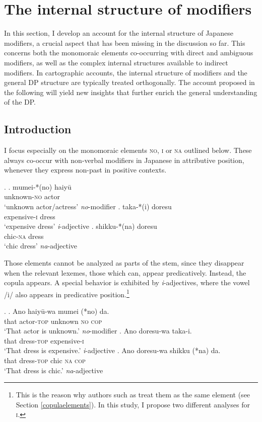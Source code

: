 \section{The internal structure of modifiers} \label{internalstructure}

In this section, I develop an account for the internal structure of Japanese modifiers, a crucial aspect that has been missing in the discussion so far. This concerns both the monomoraic elements co-occurring with direct and ambiguous modifiers, as well as the complex internal structures available to indirect modifiers. In cartographic accounts, the internal structure of modifiers and the general DP structure are typically treated orthogonally. The account proposed in the following will yield new insights that further enrich the general understanding of the DP.

\subsection{Introduction}
\largerpage
I focus especially on the monomoraic elements \textsc{no}, \textsc{i} or \textsc{na} outlined below. These always co-occur with non-verbal modifiers in Japanese in attributive position, whenever they express non-past in positive contexts.

\ex. \ag. mumei-*(no) haiyū\\
unknown-\textsc{no} actor\\
`unknown actor/actress’ \null \hfill \textit{no}-modifier \label{mumeino}
\bg. taka-*(i) doresu\\
expensive-\textsc{i} dress\\
`expensive dress' \null \hfill \textit{i}-adjective \label{takaimod1}
\cg. shikku-*(na) doresu\\
chic-\textsc{na} dress\\
`chic dress' \null \hfill \textit{na}-adjective \label{shikkunamod1}

Those elements cannot be analyzed as parts of the stem, since they disappear when the relevant lexemes, those which can, appear predicatively. Instead, the copula appears. A special behavior is exhibited by \textit{i}-adjectives, where the vowel /i/ also appears in predicative position.\footnote{This is the reason why authors such as \citet{nishiyama:1999:adj} treat them as the same element (see Section \ref{copulaelements}). In this study, I propose two different analyses for \textsc{i}.}

\ex. \label{nopredicativeno} \ag. Ano haiyū-wa mumei (*no) da.\\
that actor-\textsc{top} unknown \textsc{no} \textsc{cop}\\
`That actor is unknown.’ \null \hfill \textit{no}-modifier
\bg. Ano doresu-wa taka-i.\\
that dress-\textsc{top} expensive-\textsc{i}\\
`That dress is expensive.' \null \hfill \textit{i}-adjective
\cg. Ano doresu-wa shikku (*na) da.\\
that dress-\textsc{top} chic \textsc{na} \textsc{cop}\\
`That dress is chic.' \null \hfill \textit{na}-adjective

